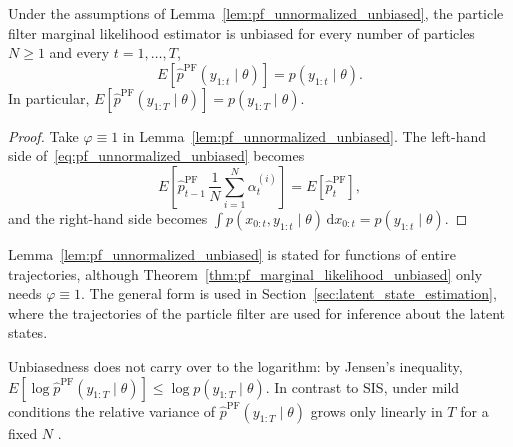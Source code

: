 \begin{theorem}
    \label{thm:pf_marginal_likelihood_unbiased}
    Under the assumptions of Lemma~\ref{lem:pf_unnormalized_unbiased}, the particle filter marginal likelihood estimator is unbiased for every number of particles $N\ge 1$ and every $t=1,\ldots,T$,
    \begin{equation}
        E\left[\hat{p}^{\mathrm{PF}}(y_{1:t}\mid\theta)\right] = p(y_{1:t}\mid\theta).
    \end{equation}
    In particular, $E\left[\hat{p}^{\mathrm{PF}}(y_{1:T}\mid\theta)\right] = p(y_{1:T}\mid\theta)$.
\end{theorem}
\begin{proof}
    Take $\varphi\equiv 1$ in Lemma~\ref{lem:pf_unnormalized_unbiased}. The left-hand side of~\eqref{eq:pf_unnormalized_unbiased} becomes
    \begin{equation}
        E\left[\hat{p}^{\mathrm{PF}}_{t-1} \, \frac{1}{N}\sum_{i=1}^{N} \alpha_t^{(i)}\right] = E\left[\hat{p}^{\mathrm{PF}}_t\right],
    \end{equation}
    and the right-hand side becomes $\int p(x_{0:t},y_{1:t}\mid\theta)\,\mathrm{d}x_{0:t} = p(y_{1:t}\mid\theta)$.
\end{proof}

Lemma~\ref{lem:pf_unnormalized_unbiased} is stated for functions of entire trajectories, although Theorem~\ref{thm:pf_marginal_likelihood_unbiased} only needs $\varphi\equiv 1$. The general form is used in Section~\ref{sec:latent_state_estimation}, where the trajectories of the particle filter are used for inference about the latent states.

Unbiasedness does not carry over to the logarithm: by Jensen's inequality, $E[\log\hat{p}^{\mathrm{PF}}(y_{1:T}\mid\theta)] \le \log p(y_{1:T}\mid\theta)$. In contrast to SIS, under mild conditions the relative variance of $\hat{p}^{\mathrm{PF}}(y_{1:T}\mid\theta)$ grows only linearly in $T$ for a fixed $N$ \cite{chopin2020smc}.

